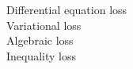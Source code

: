 \documentclass[preview]{standalone}
\begin{document}
Differential equation loss\\Variational loss\\Algebraic loss\\Inequality loss\\
\end{document}
